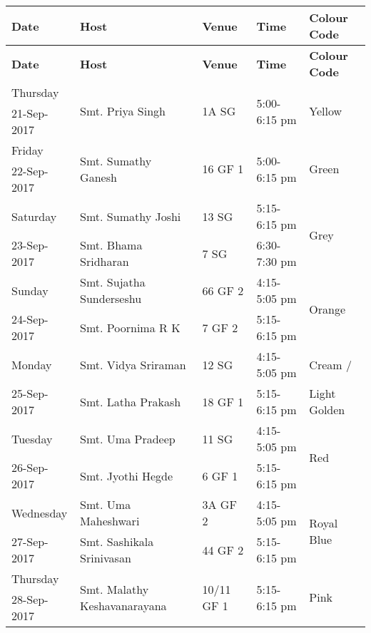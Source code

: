 \documentclass[12pt]{article}
\begin{document}
\begin{center}
\begin{longtable}{|p{}|p{}|p{}|p{}|p{}|}
\hline \textbf{Date}&\textbf{Host}&\textbf{Venue}&\textbf{Time}&\textbf{Colour Code}\\\hline
\endfirsthead
\hline \textbf{Date}&\textbf{Host}&\textbf{Venue}&\textbf{Time}&\textbf{Colour Code}\\\hline
\endhead

Thursday&\multirow{2}{*}{Smt. Priya Singh}&\multirow{2}{*}{1A SG}&\multirow{2}{*}{5:00-6:15 pm}&\multirow{2}{*}{Yellow}\\
21-Sep-2017&&&&\\\hline

Friday&\multirow{2}{*}{Smt. Sumathy Ganesh}&\multirow{2}{*}{16 GF 1}&\multirow{2}{*}{5:00-6:15 pm}&\multirow{2}{*}{Green}\\
22-Sep-2017&&&&\\\hline\hline

Saturday &Smt. Sumathy Joshi&13 SG&5:15-6:15 pm&\multirow{2}{*}{Grey}\\\cline{2-4}
23-Sep-2017&Smt. Bhama Sridharan&7 SG&6:30-7:30 pm&\\\hline\hline

Sunday &Smt. Sujatha Sunderseshu&66 GF 2&4:15-5:05 pm&\multirow{2}{*}{Orange}\\\cline{2-4}
24-Sep-2017&Smt. Poornima R K&7 GF 2&5:15-6:15 pm&\\\hline

Monday &Smt. Vidya Sriraman&12 SG&4:15-5:05 pm&Cream / \\\cline{2-4}
25-Sep-2017&Smt. Latha Prakash&18 GF 1&5:15-6:15 pm&Light Golden\\\hline

Tuesday &Smt. Uma Pradeep&11 SG&4:15-5:05 pm&\multirow{2}{*}{Red}\\\cline{2-4}
26-Sep-2017&Smt. Jyothi Hegde&6 GF 1&5:15-6:15 pm&\\\hline

Wednesday &Smt. Uma Maheshwari&3A GF 2&4:15-5:05 pm&\multirow{2}{*}{Royal Blue}\\\cline{2-4}
27-Sep-2017&Smt. Sashikala Srinivasan&44 GF 2&5:15-6:15 pm&\\\hline

Thursday&\multirow{2}{*}{Smt. Malathy Keshavanarayana}&\multirow{2}{*}{10/11 GF 1}&\multirow{2}{*}{5:15-6:15 pm}&\multirow{2}{*}{Pink}\\
28-Sep-2017&&&&\\\hline


\end{longtable}
\end{center}
\end{document}
